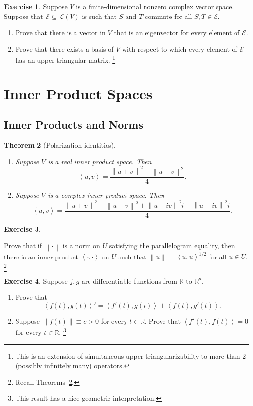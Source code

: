 \documentclass[colorlinks]{tufte-handout}
\theoremstyle{plain} %
\newtheorem{thm}{Theorem}
\theoremstyle{definition}
\newtheorem{exer}[thm]{Exercise}
\theoremstyle{remark}
\newcommand{\norm}[1]{\mathopen{}\left\lVert#1\right\rVert}
\newcommand{\inp}[2]{\mathopen{}\left\langle#1,#2\right\rangle}
\newcommand{\R}{\mathbb{R}}
\renewcommand{\L}{\mathcal{L}}
\newcommand{\E}{\mathcal{E}}
\begin{document}
\begin{exer}
	Suppose $V$ is a finite-dimensional nonzero complex vector space. Suppose that $\E\subseteq\L(V)$ is such that $S$ and $T$ commute for all $S,T\in\E$.
	\begin{enumerate}
		\item Prove that there is a vector in $V$ that is an eigenvector for every element of $\E$.
		\item Prove that there exists a basis of $V$ with respect to which every element of $\E$ has an upper-triangular matrix.%
		\footnote{This is an extension of simultaneous upper triangularizability to more than $2$ (possibly infinitely many) operators.}
	\end{enumerate}
\end{exer}


\section{Inner Product Spaces}
\subsection{Inner Products and Norms}
\begin{thm}[Polarization identities]
	\begin{enumerate}
		\item Suppose $V$ is a real inner product space. Then
		\[\inp{u}{v}=\frac{\norm{u+v}^2-\norm{u-v}^2}{4}.\]
		\item Suppose $V$ is a complex inner product space. Then
		\[\inp{u}{v}=\frac{\norm{u+v}^2-\norm{u-v}^2+\norm{u+iv}^2i-\norm{u-iv}^2i}{4}.\]
	\end{enumerate}
	\label{thms: polarization identities}
\end{thm}

\begin{exer}\label{exer: condition for a norm-induced inner product}

	Prove that if $\norm{\cdot}$ is a norm on $U$ satisfying the parallelogram equality, then there is an inner product $\inp{\cdot}{\cdot}$ on $U$ such that $\norm{u}=\inp{u}{u}^{1/2}$ for all $u\in U$.%
	\footnote{Recall Theorems~\ref{thms: polarization identities}.}
\end{exer}

\begin{exer}
	Suppose $f,g$ are differentiable functions from $\R$ to $\R^n$.
	\begin{enumerate}
		\item Prove that
		\[\inp{f(t)}{g(t)}'=\inp{f'(t)}{g(t)}+\inp{f(t)}{g'(t)}.\]
		\item Suppose $\norm{f(t)}\equiv c>0$ for every $t\in\R$. Prove that $\inp{f'(t)}{f(t)}=0$ for every $t\in\R$.%
		\footnote{This result has a nice geometric interpretation.}
	\end{enumerate}
\end{exer}
\end{document}
